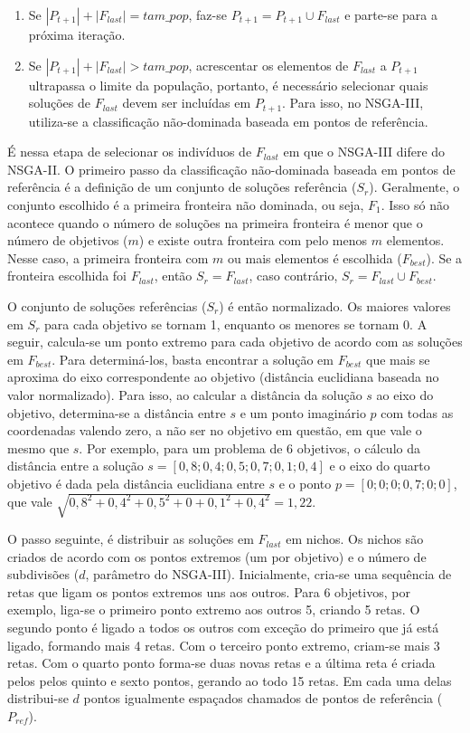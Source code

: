 \begin{enumerate}
	\item Se $|P_{t+1}| + |F_{last}| = tam\_pop$, faz-se $P_{t+1} = P_{t+1} \cup F_{last}$ e parte-se para a próxima iteração.
	\item Se $|P_{t+1}| + |F_{last}| > tam\_pop$, acrescentar os elementos de $F_{last}$ a $P_{t+1}$ ultrapassa o limite da população, portanto, é necessário selecionar quais soluções de $F_{last}$ devem ser incluídas em $P_{t+1}$. Para isso, no NSGA-III, utiliza-se a classificação não-dominada baseada em pontos de referência.
\end{enumerate}

É nessa etapa de selecionar os indivíduos de $F_{last}$ em que o NSGA-III difere do NSGA-II. O primeiro passo da classificação não-dominada baseada em pontos de referência é a definição de um conjunto de soluções referência ($S_r$). Geralmente, o conjunto escolhido é a primeira fronteira não dominada, ou seja, $F_1$. Isso só não acontece quando o número de soluções na primeira fronteira é menor que o número de objetivos ($m$) e existe outra fronteira com pelo menos $m$ elementos. Nesse caso, a primeira fronteira com $m$ ou mais elementos é escolhida ($F_{best}$). Se a fronteira escolhida foi $F_{last}$, então $S_r = F_{last}$, caso contrário, $S_r = F_{last} \cup F_{best}$.

O conjunto de soluções referências ($S_r$) é então normalizado. Os maiores valores em $S_r$ para cada objetivo se tornam 1, enquanto os menores se tornam 0. A seguir, calcula-se um ponto extremo para cada objetivo de acordo com as soluções em $F_{best}$. Para determiná-los, basta encontrar a solução em $F_{best}$ que mais se aproxima do eixo correspondente ao objetivo (distância euclidiana baseada no valor normalizado). Para isso, ao calcular a distância da solução $s$ ao eixo do objetivo, determina-se a distância entre $s$ e um ponto imaginário $p$ com todas as coordenadas valendo zero, a não ser no objetivo em questão, em que vale o mesmo que $s$. Por exemplo, para um problema de 6 objetivos, o cálculo da distância entre a solução $s = [0,8; 0,4; 0,5; 0,7; 0,1; 0,4]$ e o eixo do quarto objetivo é dada pela distância euclidiana entre $s$ e o ponto $p = [0; 0; 0; 0,7; 0; 0]$, que vale $\sqrt{0,8^2 + 0,4^2 + 0,5^2 + 0 + 0,1^2 + 0,4^2} = 1,22$.

O passo seguinte, é distribuir as soluções em $F_{last}$ em nichos. Os nichos são criados de acordo com os pontos extremos (um por objetivo) e o número de subdivisões ($d$, parâmetro do NSGA-III). Inicialmente, cria-se uma sequência de retas que ligam os pontos extremos uns aos outros. Para 6 objetivos, por exemplo, liga-se o primeiro ponto extremo aos outros 5, criando 5 retas. O segundo ponto é ligado a todos os outros com exceção do primeiro que já está ligado, formando mais 4 retas. Com o terceiro ponto extremo, criam-se mais 3 retas. Com o quarto ponto forma-se duas novas retas e a última reta é criada pelos pelos quinto e sexto pontos, gerando ao todo 15 retas. Em cada uma delas distribui-se $d$ pontos igualmente espaçados chamados de pontos de referência ($P_{ref}$).

